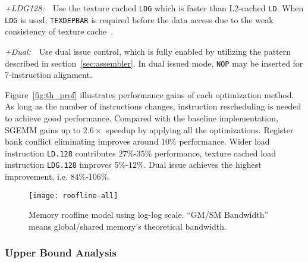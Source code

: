{\it +LDG128:}~~Use the texture cached {\tt LDG} which is faster than L2-cached {\tt LD}. 
When {\tt LDG} is used, {\tt TEXDEPBAR} is required before the data access due to the weak consistency of texture cache~\cite{lukyanov2014efficient}.

{\it +Dual:}~~Use dual issue control, which is fully enabled by utilizing the pattern described in section~\ref{sec:assembler}.
In dual issued mode, {\tt NOP} may be inserted for 7-instruction alignment.

Figure~\ref{fig:th_prof} illustrates performance gains of each optimization method.
As long as the number of instructions changes, instruction rescheduling is needed to achieve good performance.
Compared with the baseline implementation, SGEMM gains up to $2.6\times$ speedup by applying all the optimizations.
Register bank conflict eliminating improves around $10\%$ performance. 
Wider load instruction {\tt LD.128} contributes $27\%$-$35\%$ performance, texture cached
load instruction {\tt LDG.128} improves $5\%$-$12\%$.
Dual issue achieves the highest improvement, i.e. $84\%$-$106\%$.


\begin{figure}[htbp]
\begin{center}
\texttt{[image: roofline-all]}
    \caption{\small Memory roofline model using log-log scale. ``GM/SM Bandwidth'' means global/shared memory's theoretical
    bandwidth.} %
\label{fig:roofline_all}
\end{center}
\end{figure}



\subsubsection{Upper Bound Analysis}

